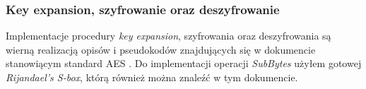 \subsubsection{Key expansion, szyfrowanie oraz deszyfrowanie}
Implementacje procedury \textit{key expansion}, szyfrowania oraz deszyfrowania są wierną realizacją opisów i pseudokodów znajdujących się w dokumencie stanowiącym standard AES \cite{aes-standard}. Do implementacji operacji \textit{SubBytes} użyłem gotowej \textit{Rijandael's S-box}, którą również można znaleźć w tym dokumencie.

